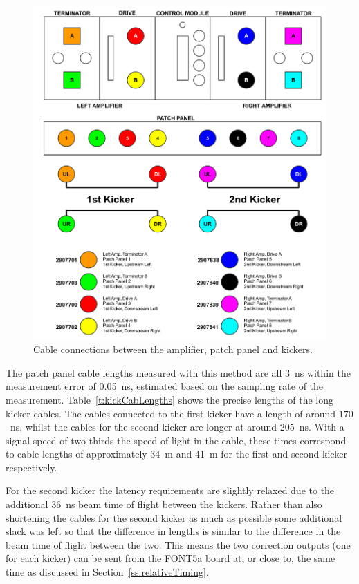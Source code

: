 \begin{figure}
  \centering
  \includegraphics[width=\textwidth]{Figures/commissioning/kickerCables}
  \caption{Cable connections between the amplifier, patch panel and kickers.}
  \label{f:kickerCables}
\end{figure}

The patch panel cable lengths measured with this method are all 3~ns within the measurement error of 0.05~ns, estimated based on the sampling rate of the measurement. Table~\ref{t:kickCabLengths} shows the precise lengths of the long kicker cables. The cables connected to the first kicker have a length of around \(170\)~ns, whilst the cables for the second kicker are longer at around \(205\)~ns. With a signal speed of two thirds the speed of light in the cable, these times correspond to cable lengths of approximately 34~m and 41~m for the first and second kicker respectively.

For the second kicker the latency requirements are slightly relaxed due to the additional 36~ns beam time of flight between the kickers. Rather than also shortening the cables for the second kicker as much as possible some additional slack was left so that the difference in lengths is similar to the difference in the beam time of flight between the two. This means the two correction outputs (one for each kicker) can be sent from the FONT5a board at, or close to, the same time as discussed in Section~\ref{ss:relativeTiming}.

